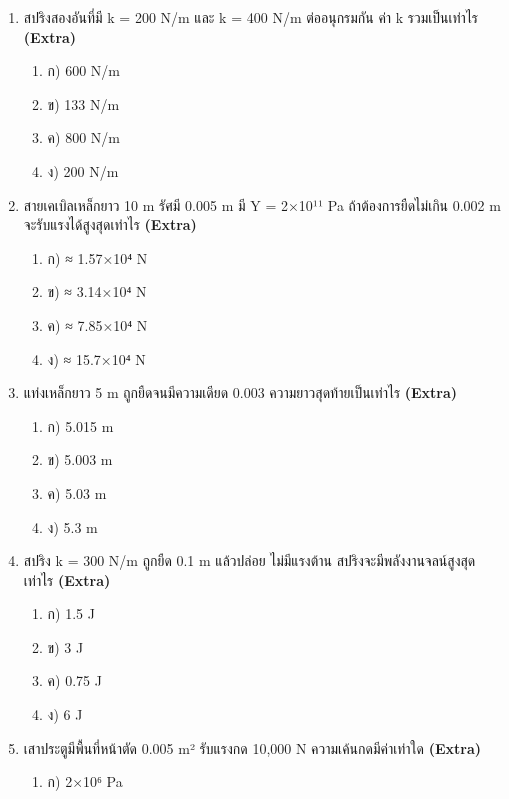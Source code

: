 \documentclass[12pt]{article}
\begin{document}
\begin{enumerate}[label=\arabic*.]
\begin{enumerate}[label=)]
\item ก) Elastic limit
\item ข) Proportional limit
\item ค) Breaking point
\item ง) Yield point
\end{enumerate}
\item สปริงสองอันที่มี k = 200 N/m และ k = 400 N/m ต่ออนุกรมกัน ค่า k รวมเป็นเท่าไร \hfill \textbf{\small (Extra)}
\begin{enumerate}[label=)]
\item ก) 600 N/m
\item ข) 133 N/m
\item ค) 800 N/m
\item ง) 200 N/m
\end{enumerate}
\item สายเคเบิลเหล็กยาว 10 m รัศมี 0.005 m มี Y = 2×10¹¹ Pa ถ้าต้องการยืดไม่เกิน 0.002 m จะรับแรงได้สูงสุดเท่าไร \hfill \textbf{\small (Extra)}
\begin{enumerate}[label=)]
\item ก) ≈ 1.57×10⁴ N
\item ข) ≈ 3.14×10⁴ N
\item ค) ≈ 7.85×10⁴ N
\item ง) ≈ 15.7×10⁴ N
\end{enumerate}
\item แท่งเหล็กยาว 5 m ถูกยืดจนมีความเดียด 0.003 ความยาวสุดท้ายเป็นเท่าไร \hfill \textbf{\small (Extra)}
\begin{enumerate}[label=)]
\item ก) 5.015 m
\item ข) 5.003 m
\item ค) 5.03 m
\item ง) 5.3 m
\end{enumerate}
\item สปริง k = 300 N/m ถูกยืด 0.1 m แล้วปล่อย ไม่มีแรงต้าน สปริงจะมีพลังงานจลน์สูงสุดเท่าไร \hfill \textbf{\small (Extra)}
\begin{enumerate}[label=)]
\item ก) 1.5 J
\item ข) 3 J
\item ค) 0.75 J
\item ง) 6 J
\end{enumerate}
\item เสาประตูมีพื้นที่หน้าตัด 0.005 m² รับแรงกด 10,000 N ความเค้นกดมีค่าเท่าใด \hfill \textbf{\small (Extra)}
\begin{enumerate}[label=)]
\item ก) 2×10⁶ Pa

\end{enumerate}
\end{enumerate}
\end{document}

